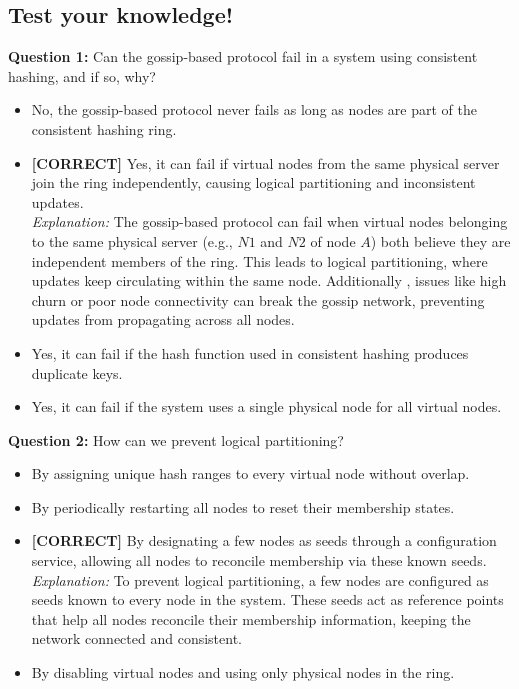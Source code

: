\subsection*{Test your knowledge!}
\vspace{0.3cm}
\noindent
\textbf{Question 1:} Can the gossip-based protocol fail in a system using consistent hashing, and if so, why?
\\[0.2cm]
\begin{itemize}
 \item No, the gossip-based protocol never fails as long as nodes are part of the consistent hashing ring.
 \item \textbf{[CORRECT]} Yes, it can fail if virtual nodes from the same physical server join the ring independently, causing logical partitioning and inconsistent updates.
\\[0.1cm]
\textit{Explanation:} 
The gossip-based protocol can fail when virtual nodes belonging to the same physical server (e.g., {{\(N1\)}} and {{\(N2\)}} of node {{\(A\)}}) both believe they are independent members of the ring. This leads to logical partitioning, where updates keep circulating within the same node. Additionally , issues like high churn or poor node connectivity can break the gossip network, preventing updates from propagating across all nodes.
 \item Yes, it can fail if the hash function used in consistent hashing produces duplicate keys.
 \item Yes, it can fail if the system uses a single physical node for all virtual nodes.
\end{itemize}
\vspace{0.3cm}
\noindent
\textbf{Question 2:} How can we prevent logical partitioning?
\\[0.2cm]
\begin{itemize}
 \item By assigning unique hash ranges to every virtual node without overlap.
 \item By periodically restarting all nodes to reset their membership states.
 \item \textbf{[CORRECT]} By designating a few nodes as seeds through a configuration service, allowing all nodes to reconcile membership via these known seeds.
\\[0.1cm]
\textit{Explanation:} 
To prevent logical partitioning, a few nodes are configured as seeds known to every node in the system. These seeds act as reference points that help all nodes reconcile their membership information, keeping the network connected and consistent.
 \item By disabling virtual nodes and using only physical nodes in the ring.
\end{itemize}

